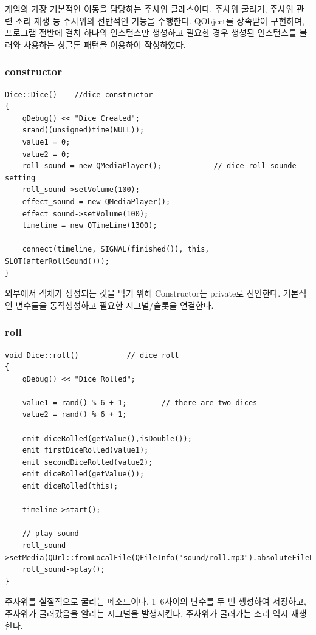 \documentclass[10pt,oneside,a4paper,titlepage]{article}
\begin{document}
게임의 가장 기본적인 이동을 담당하는 주사위 클래스이다. 주사위 굴리기, 주사위 관련 소리 재생 등 주사위의 전반적인 기능을 수행한다. QObject를 상속받아 구현하며, 프로그램 전반에 걸쳐 하나의 인스턴스만 생성하고 필요한 경우 생성된 인스턴스를 불러와 사용하는 싱글톤 패턴을 이용하여 작성하였다.

\subsubsection{constructor}

\begin{lstlisting}[caption={Dice constructor}]
Dice::Dice()    //dice constructor
{
    qDebug() << "Dice Created";
    srand((unsigned)time(NULL));
    value1 = 0;
    value2 = 0;
    roll_sound = new QMediaPlayer();            // dice roll sounde setting
    roll_sound->setVolume(100);
    effect_sound = new QMediaPlayer();
    effect_sound->setVolume(100);
    timeline = new QTimeLine(1300);

    connect(timeline, SIGNAL(finished()), this, SLOT(afterRollSound()));
}
\end{lstlisting}
외부에서 객체가 생성되는 것을 막기 위해 Constructor는 private로 선언한다. 기본적인 변수들을 동적생성하고 필요한 시그널/슬롯을 연결한다.

\subsubsection{roll}

\begin{lstlisting}[caption={Dice roll}]
void Dice::roll()           // dice roll 
{
    qDebug() << "Dice Rolled";

    value1 = rand() % 6 + 1;        // there are two dices
    value2 = rand() % 6 + 1;

    emit diceRolled(getValue(),isDouble());
    emit firstDiceRolled(value1);
    emit secondDiceRolled(value2);
    emit diceRolled(getValue());
    emit diceRolled(this);

    timeline->start();

    // play sound
    roll_sound->setMedia(QUrl::fromLocalFile(QFileInfo("sound/roll.mp3").absoluteFilePath()));
    roll_sound->play();
}
\end{lstlisting}

주사위를 실질적으로 굴리는 메소드이다. 1~6사이의 난수를 두 번 생성하여 저장하고, 주사위가 굴러갔음을 알리는 시그널을 발생시킨다. 주사위가 굴러가는 소리 역시 재생한다.
\end{document}
